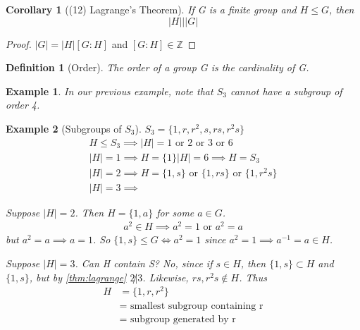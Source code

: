 \documentclass[11pt, oneside]{book}
\theoremstyle{break}
\newtheorem*{proof}{Proof}
\newtheorem{crly}{Corollary}[section]
\newtheorem{defn}{Definition}[section]
\newtheorem{eg}{Example}[section]
\newcommand{\bb}[1]{\mathbb{#1}}			%
\begin{document}
\begin{crly}[(12) Lagrange's Theorem]\label{thm:lagrange}
    If G is a finite group and $H \leq G$, then
    \begin{equation}
        |H| \Big| |G|
    \end{equation}
\end{crly}

\begin{proof}
    $|G| = |H|[G : H]$ and $[G : H] \in \bb{Z}$
\end{proof}

\begin{defn}[Order]
    The order of a group G is the cardinality of G.
\end{defn}

\begin{eg}
    In our previous example, note that $S_3$ cannot have a subgroup of order 4.
\end{eg}

\begin{eg}[Subgroups of $S_3$]
    $S_3 = \{1, r, r^2, s, rs, r^2s\}$
    \begin{gather*}
        H \leq S_3 \implies |H| = 1 \text{ or } 2 \text{ or } 3 \text{ or } 6 \\
        |H| = 1 \implies H =\{1\}
        |H| = 6 \implies H = S_3 \\
        |H| = 2 \implies H = \{1,s\} \text{ or } \{1, rs\} \text{ or } \{1, r^2s\} \\
        |H| = 3 \implies 
    \end{gather*}

    Suppose $|H| = 2$. Then $H = \{1, a\}$ for some $a \in G$.
    \begin{gather*}
        a^2 \in H \implies a^2 = 1 \text{ or } a^2 = a 
    \end{gather*}
    but $a^2 = a \implies a = 1$.
    So $\{1, s\} \leq G \iff a^2 = 1$ since $a^2 = 1 \implies a^{-1} = a \in H$.

    Suppose $|H| = 3$. Can H contain S? No, since if $s \in H$, then $\{1, s\} \subset H$ and $\{1, s\}$, but by \autoref{thm:lagrange} $2 \not| 3$. Likewise, $rs, r^2 s \notin H$. Thus
    \begin{align*}
        H &= \{1, r, r^2\} \\
         &= \text{ smallest subgroup containing r} \\
         &= \text{ subgroup generated by r}
    \end{align*}
\end{eg}
\end{document}
